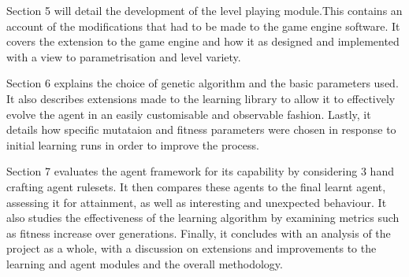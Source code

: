 Section 5 will detail the development of the level playing module.This contains an account of the modifications that had to be made to the game engine software. It covers the extension to the game engine and how it as designed and implemented with a view to parametrisation and level variety.

Section 6 explains the choice of genetic algorithm and the basic parameters used. It also describes extensions made to the learning library to allow it to effectively evolve the agent in an easily customisable and observable fashion. Lastly, it details how specific mutataion and fitness parameters were chosen in response to initial learning runs in order to improve the process.

Section 7 evaluates the agent framework for its capability by considering 3 hand crafting agent rulesets. It then compares these agents to the final learnt agent, assessing it for attainment, as well as interesting and unexpected behaviour. It also studies the effectiveness of the learning algorithm by examining metrics such as fitness increase over generations. Finally, it concludes with an analysis of the project as a whole, with a discussion on extensions and improvements to the learning and agent modules and the overall methodology.